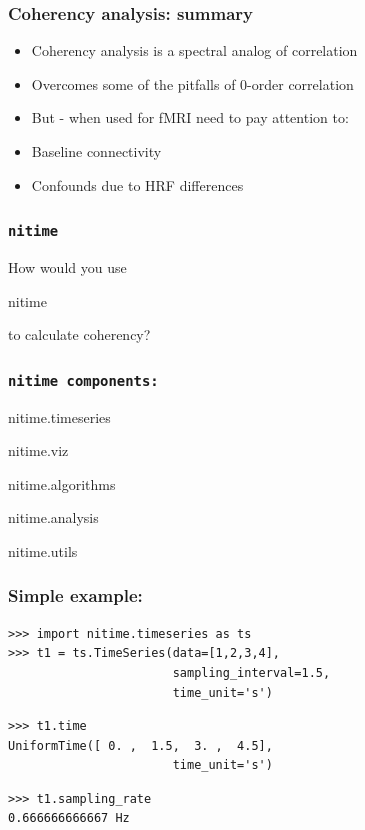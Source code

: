 \documentclass{beamer}
\begin{document}
\begin{frame}
\frametitle{Coherency analysis: summary}
\pause
\begin{itemize}
\item
Coherency analysis is a spectral analog of correlation
\pause
\item 
Overcomes some of the pitfalls of 0-order correlation
\pause
\item
But - when used for fMRI need to pay attention to: 
\pause
\item  
Baseline connectivity
\pause
\item
Confounds due to HRF differences
\end{itemize}
\end{frame}

\begin{frame}
\frametitle{\tt{nitime}}
How would you use \begin{tt}nitime\end{tt}

to calculate coherency?
\end{frame}

\begin{frame}
\frametitle{\tt{nitime} components:}
\begin{itemize}
\begin{tt}
\pause
\item
nitime.timeseries
\pause
\item
nitime.viz
\pause
\item
nitime.algorithms
\pause
\item
nitime.analysis
\pause 
\item
nitime.utils
\end{tt}
\end{itemize}
\end{frame}

\begin{frame}[fragile]
\frametitle{Simple example:}
\pause
\begin{lstlisting}
>>> import nitime.timeseries as ts 
>>> t1 = ts.TimeSeries(data=[1,2,3,4],
                       sampling_interval=1.5,
                       time_unit='s')
\end{lstlisting}
\pause
\begin{lstlisting}
>>> t1.time
UniformTime([ 0. ,  1.5,  3. ,  4.5], 
                       time_unit='s')
\end{lstlisting}

\pause
\begin{lstlisting}
>>> t1.sampling_rate
0.666666666667 Hz
\end{lstlisting}
\end{frame}
\end{document}

